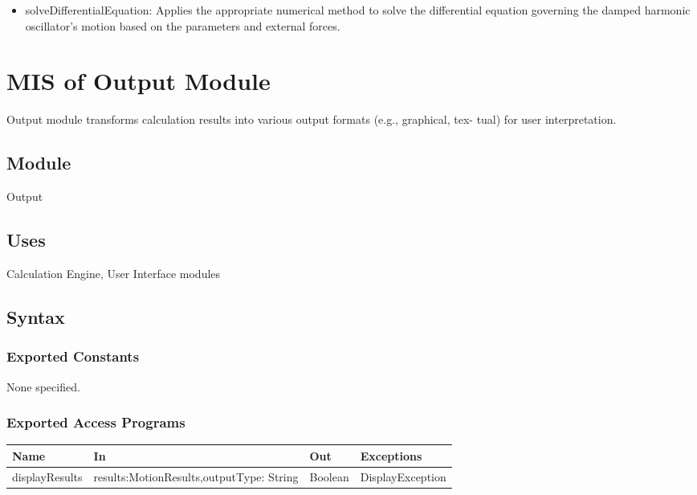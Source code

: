 \documentclass[12pt, titlepage]{article}
\begin{document}
\begin{itemize}
  \item solveDifferentialEquation: Applies the appropriate numerical method to solve the differential equation governing the damped harmonic oscillator's motion based on the parameters and external forces.
\end{itemize}



\section{MIS of Output Module} \label{mOM}

Output module transforms calculation results into various output formats (e.g., graphical, tex-
tual) for user interpretation.

\subsection{Module}
Output

\subsection{Uses}
Calculation Engine, User Interface modules

\subsection{Syntax}

\subsubsection{Exported Constants}
None specified.

\subsubsection{Exported Access Programs}

\begin{center}
\begin{tabular}{p{4cm} p{4cm} p{3cm} p{5cm}}
\hline
\textbf{Name} & \textbf{In} & \textbf{Out} & \textbf{Exceptions} \\
\hline
displayResults & results:MotionResults,outputType: String & Boolean & DisplayException \\
\hline
\end{tabular}
\end{center}
\end{document}
